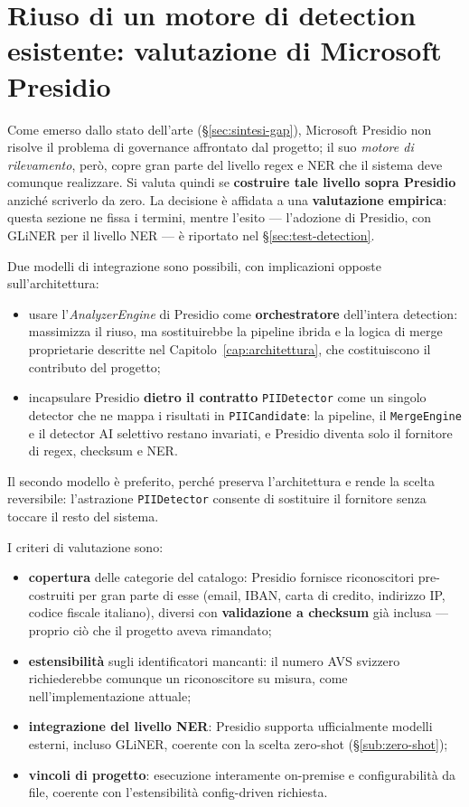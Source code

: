 \section{Riuso di un motore di detection esistente: valutazione di Microsoft Presidio}
\label{sec:valutazione-presidio}

Come emerso dallo stato dell'arte (§\ref{sec:sintesi-gap}), Microsoft Presidio non risolve il problema di governance affrontato dal progetto; il suo \textit{motore di rilevamento}, però, copre gran parte del livello regex e NER che il sistema deve comunque realizzare. Si valuta quindi se \textbf{costruire tale livello sopra Presidio} anziché scriverlo da zero. La decisione è affidata a una \textbf{valutazione empirica}: questa sezione ne fissa i termini, mentre l'esito --- l'adozione di Presidio, con GLiNER per il livello NER --- è riportato nel §\ref{sec:test-detection}.

Due modelli di integrazione sono possibili, con implicazioni opposte sull'architettura:
\begin{itemize}
	\item usare l'\textit{AnalyzerEngine} di Presidio come \textbf{orchestratore} dell'intera detection: massimizza il riuso, ma sostituirebbe la pipeline ibrida e la logica di merge proprietarie descritte nel Capitolo~\ref{cap:architettura}, che costituiscono il contributo del progetto;
	\item incapsulare Presidio \textbf{dietro il contratto} \texttt{PIIDetector} come un singolo detector che ne mappa i risultati in \texttt{PIICandidate}: la pipeline, il \texttt{MergeEngine} e il detector AI selettivo restano invariati, e Presidio diventa solo il fornitore di regex, checksum e NER.
\end{itemize}
Il secondo modello è preferito, perché preserva l'architettura e rende la scelta reversibile: l'astrazione \texttt{PIIDetector} consente di sostituire il fornitore senza toccare il resto del sistema.

I criteri di valutazione sono:
\begin{itemize}
	\item \textbf{copertura} delle categorie del catalogo: Presidio fornisce riconoscitori pre-costruiti per gran parte di esse (email, IBAN, carta di credito, indirizzo IP, codice fiscale italiano), diversi con \textbf{validazione a checksum} già inclusa --- proprio ciò che il progetto aveva rimandato;
	\item \textbf{estensibilità} sugli identificatori mancanti: il numero AVS svizzero richiederebbe comunque un riconoscitore su misura, come nell'implementazione attuale;
	\item \textbf{integrazione del livello NER}: Presidio supporta ufficialmente modelli esterni, incluso GLiNER, coerente con la scelta zero-shot (§\ref{sub:zero-shot});
	\item \textbf{vincoli di progetto}: esecuzione interamente on-premise e configurabilità da file, coerente con l'estensibilità config-driven richiesta.
\end{itemize}

